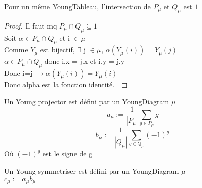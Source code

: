 \begin{lemma}[sectPuQu]
    \label{sectPuQu}
    \leanok
    Pour un même YoungTableau, l'intersection de $P_{\mu}$ et $Q_{\mu}$ est ${1}$
\end{lemma}
\begin{proof}
    \leanok
    Il faut mq $P_{\mu} \cap Q_{\mu} \subseteq {1}$\\
    Soit $\alpha \in P_{\mu} \cap Q_{\mu}$ et i $\in \mu$\\
    Comme $Y_{\mu}$ est bijectif, $\exists$ j $\in \mu$, $\alpha ( Y_{\mu} (i)) = Y_{\mu} (j)$\\
    $\alpha \in P_{\mu} \cap Q_{\mu}$ donc i.x = j.x et i.y = j.y\\
    Donc i=j $\to \alpha(Y_{\mu}(i))=Y_{\mu}(i)$\\
    Donc alpha est la fonction identité.\
\end{proof}

\begin{definition}[YoungProjectors]
    \label{YoungProjectors}
    Un Young projector est défini par un YoungDiagram $\mu$\\
    \[ a_{\mu} := \frac{1}{|P_{\mu}|}\sum_{g \in P_{\mu}}g \]
    \[ b_{\mu} := \frac{1}{|Q_{\mu}|}\sum_{g \in Q_{\mu}}(-1)^{g}\]
    Où $(-1)^{g}$ est le signe de g
\end{definition}

\begin{definition}[YoungSymmetriser]
    \label{YoungSymmetriser}
    Un Young symmetriser est défini par un YoungDiagram $\mu$\\
    $c_{\mu} := a_{\mu} b_{\mu} $
\end{definition}